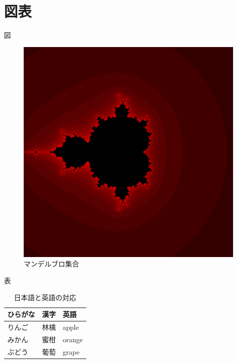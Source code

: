 \documentclass[aspectratio=169]{beamer}
\begin{document}
\section{図表}
\begin{frame}{図}
    \begin{figure}[htbp]
        \begin{center}
            \includegraphics[scale=0.02]{figure/mandelbrot.png}
            \caption{マンデルブロ集合}
        \end{center}
    \end{figure}
\end{frame}

\begin{frame}{表}
    \begin{table}[H]
        \caption{日本語と英語の対応}
        \label{table:ja-en}
        \begin{tabular}{lll}
            \toprule
            ひらがな & 漢字 & 英語   \\
            \midrule
            りんご   & 林檎 & apple  \\
            みかん   & 蜜柑 & orange \\
            ぶどう   & 葡萄 & grape  \\
            \bottomrule
        \end{tabular}
    \end{table}
\end{frame}
\end{document}
